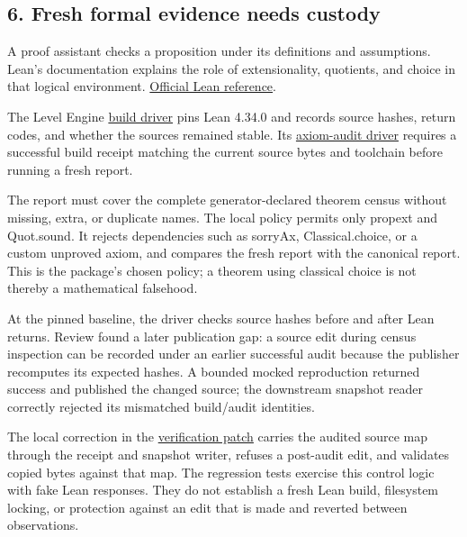\documentclass[
  11pt,
]{article}
\begin{document}
\hypertarget{fresh-formal-evidence-needs-custody}{%
\subsection{6. Fresh formal evidence needs
custody}\label{fresh-formal-evidence-needs-custody}}

A proof assistant checks a proposition under its definitions and
assumptions. Lean's documentation explains the role of extensionality,
quotients, and choice in that logical environment.
\href{https://lean-lang.org/theorem_proving_in_lean4/Axioms-and-Computation/}{Official
Lean reference}.

The Level Engine
\href{https://github.com/dbccpage/the_symbol_game/blob/52cb5457f6c485ba548cfd292f6012a941ed22cf/operations/use_cases/level_engine/lean_build.py}{build
driver} pins Lean 4.34.0 and records source hashes, return codes, and
whether the sources remained stable. Its
\href{https://github.com/dbccpage/the_symbol_game/blob/52cb5457f6c485ba548cfd292f6012a941ed22cf/operations/use_cases/level_engine/lean_audit.py}{axiom-audit
driver} requires a successful build receipt matching the current source
bytes and toolchain before running a fresh report.

The report must cover the complete generator-declared theorem census
without missing, extra, or duplicate names. The local policy permits
only propext and Quot.sound. It rejects dependencies such as sorryAx,
Classical.choice, or a custom unproved axiom, and compares the fresh
report with the canonical report. This is the package's chosen policy; a
theorem using classical choice is not thereby a mathematical falsehood.

At the pinned baseline, the driver checks source hashes before and after
Lean returns. Review found a later publication gap: a source edit during
census inspection can be recorded under an earlier successful audit
because the publisher recomputes its expected hashes. A bounded mocked
reproduction returned success and published the changed source; the
downstream snapshot reader correctly rejected its mismatched build/audit
identities.

The local correction in the
\href{https://github.com/dbccpage/the_symbol_game/blob/23893fc44162555fa12ceda3e1665982e3d7a14e/atlas/coda_atlas/symbol_game/verification/source_delta.patch}{verification
patch} carries the audited source map through the receipt and snapshot
writer, refuses a post-audit edit, and validates copied bytes against
that map. The regression tests exercise this control logic with fake
Lean responses. They do not establish a fresh Lean build, filesystem
locking, or protection against an edit that is made and reverted between
observations.
\end{document}
